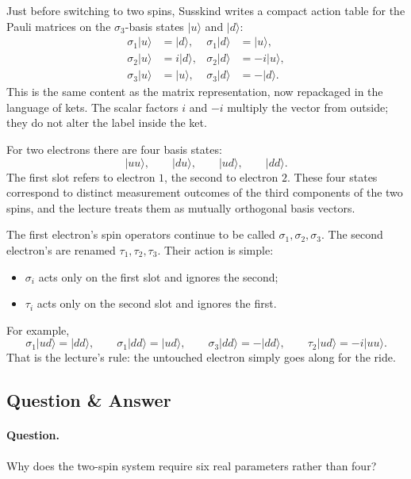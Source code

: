 Just before switching to two spins, Susskind writes a compact action table for the Pauli matrices on the \(\sigma_3\)-basis states \(|u\rangle\) and \(|d\rangle\):
\begin{align}
\sigma_1|u\rangle &= |d\rangle, &
\sigma_1|d\rangle &= |u\rangle, \\
\sigma_2|u\rangle &= i|d\rangle, &
\sigma_2|d\rangle &= -i|u\rangle, \\
\sigma_3|u\rangle &= |u\rangle, &
\sigma_3|d\rangle &= -|d\rangle.
\end{align}
This is the same content as the matrix representation, now repackaged in the language of kets. The scalar factors \(i\) and \(-i\) multiply the vector from outside; they do not alter the label inside the ket.

For two electrons there are four basis states:
\begin{equation}
|uu\rangle,\qquad |du\rangle,\qquad |ud\rangle,\qquad |dd\rangle.
\end{equation}
The first slot refers to electron \(1\), the second to electron \(2\). These four states correspond to distinct measurement outcomes of the third components of the two spins, and the lecture treats them as mutually orthogonal basis vectors.

The first electron's spin operators continue to be called \(\sigma_1,\sigma_2,\sigma_3\). The second electron's are renamed \(\tau_1,\tau_2,\tau_3\). Their action is simple:
\begin{itemize}
\item \(\sigma_i\) acts only on the first slot and ignores the second;
\item \(\tau_i\) acts only on the second slot and ignores the first.
\end{itemize}
For example,
\begin{equation}
\sigma_1|ud\rangle=|dd\rangle,
\qquad
\sigma_1|dd\rangle=|ud\rangle,
\qquad
\sigma_3|dd\rangle=-|dd\rangle,
\qquad
\tau_2|ud\rangle=-i|uu\rangle.
\end{equation}
That is the lecture's rule: the untouched electron simply goes along for the ride.

\subsection{Question \& Answer}

\paragraph{Question.} Why does the two-spin system require six real parameters rather than four?

